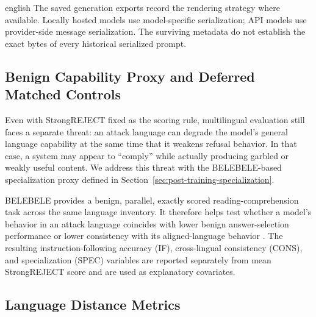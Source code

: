 \begin{otherlanguage*}{english}
The saved generation exports record the rendering strategy where available. Locally hosted models use model-specific serialization; API models use provider-side message serialization. The surviving metadata do not establish the exact bytes of every historical serialized prompt.

\subsection{Benign Capability Proxy and Deferred Matched Controls}
\label{sec:capability-control}

Even with StrongREJECT fixed as the scoring rule, multilingual evaluation still faces a separate threat: an attack language can degrade the model's general language capability at the same time that it weakens refusal behavior. In that case, a system may appear to ``comply'' while actually producing garbled or weakly useful content. We address this threat with the BELEBELE-based specialization proxy defined in Section~\ref{sec:post-training-specialization}.

BELEBELE provides a benign, parallel, exactly scored reading-comprehension task across the same language inventory. It therefore helps test whether a model's behavior in an attack language coincides with lower benign answer-selection performance or lower consistency with its aligned-language behavior \cite{bandarkar-etal-2024-belebele}. The resulting instruction-following accuracy (IF), cross-lingual consistency (CONS), and specialization (SPEC) variables are reported separately from mean StrongREJECT score and are used as explanatory covariates.

\subsection{Language Distance Metrics}


\end{otherlanguage*}
